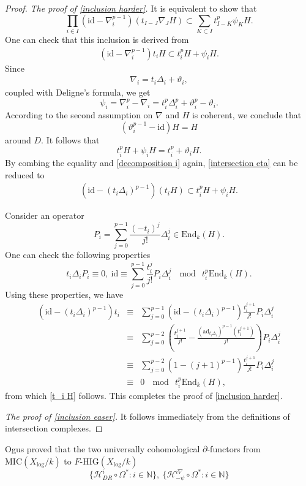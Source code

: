 \documentclass[12pt, a4paper]{article}
\begin{document}
\begin{proof}
{\itshape The proof of \eqref{inclusion harder}.}  It is equivalent to show that
$$
\prod_{i\in I}(\mathrm{id}-\nabla_i^{p-1})(t_{I-J}\nabla_JH)\subset\sum_{K\subset I}t_{I-K}^p\psi_KH.
$$
One can check that this inclusion is derived from
\begin{eqnarray}\label{intersection eta}
(\mathrm{id}-\nabla_i^{p-1})t_iH\subset t_i^pH+\psi_iH.
\end{eqnarray}
Since 
\begin{eqnarray}\label{decomposition i}
\nabla_i=t_i\Delta_i+\vartheta_i,
\end{eqnarray}
 coupled with Deligne's formula, we get
$$
\psi_i=\nabla_i^p-\nabla_i=t_i^p\Delta_i^p+\vartheta_i^p-\vartheta_i.
$$
According to the second assumption on $\nabla$ and $H$ is coherent, we conclude that 
$$(\vartheta_i^{p-1}-\mathrm{id})H=H$$ 
around $D$. It follows that 
$$
t_i^pH+\psi_iH=t_i^p+\vartheta_iH.
$$
By combing the equality and \eqref{decomposition i} again, \eqref{intersection eta} can be reduced to
\begin{eqnarray}\label{t_i H}
(\mathrm{id}-(t_i\Delta_i)^{p-1})(t_iH)\subset t_i^pH+\psi_iH.
\end{eqnarray}
 
Consider an operator 
$$P_i=\sum_{j=0}^{p-1}\frac{(-t_i)^j}{j!}\Delta_i^j\in\mathrm{End}_k(H).
$$
One can check the following properties
$$t_i\Delta_iP_i\equiv0,~\mathrm{id}\equiv\sum_{j=0}^{p-1}\frac{t_i^j}{j!}P_i\Delta_i^j~\mod~t_i^p\mathrm{End}_k(H).$$
Using these properties, we have
$$
\begin{array}{rcl}
(\mathrm{id}-(t_i\Delta_i)^{p-1})t_i&\equiv&\sum_{j=0}^{p-1}(\mathrm{id}-(t_i\Delta_i)^{p-1})\frac{t_i^{j+1}}{j!}P_i\Delta_i^j\\
&\equiv&\sum_{j=0}^{p-2}(\frac{t_i^{j+1}}{j!}-\frac{(\mathrm{ad}_{t_i\Delta_i})^{p-1}(t_i^{j+1})}{j!})P_i\Delta_i^j\\
&\equiv&\sum_{j=0}^{p-2}(1-(j+1)^{p-1})\frac{t_i^{j+1}}{j!}P_i\Delta_i^j\\
&\equiv&0~\mod~t_i^p\mathrm{End}_k(H),
\end{array}
$$
from which \eqref{t_i H} follows. This completes the proof of \eqref{inclusion harder}.

{\itshape The proof of \eqref{inclusion easer}.} It follows immediately from the definitions of intersection complexes. 
\end{proof}
Ogus proved that the two universally cohomological $\partial$-functors from $\mathrm{MIC}(X_{\log}/k)$ to $F$-$\mathrm{HIG}(X_{\log}/k)$
$$\{\mathcal H_{DR}^i\circ\Omega^*: i\in\mathbb N\},~\{\mathcal H^{i\nabla}_{-\psi}\circ\Omega^*:i\in\mathbb N\}$$  
\end{document}
